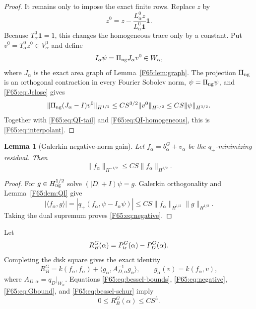 \documentclass[11pt]{amsart}
\numberwithin{equation}{section}
\newtheorem{lemma}[theorem]{Lemma}
\theoremstyle{definition}
\theoremstyle{remark}
\newcommand{\PiNG}{\Pi_{\rm ng}}
\newcommand{\qplus}{q_+}
\newcommand{\qdisk}{q_D}
\begin{document}
\begin{proof}
It remains only to impose the exact finite rows.  Replace \(z\) by
\begin{equation*}
 z^0=z-\frac{L_\alpha^0z}{L_\alpha^0\mathbf1}\mathbf1.
\end{equation*}
Because \(T_\alpha^0\mathbf1=1\), this changes the homogeneous trace only
by a constant.  Put \(v^0=T_\alpha^0z^0\in V_\alpha^0\) and define
\begin{equation}
 I_\alpha\psi=\PiNG J_\alpha v^0\in W_\alpha,
\end{equation}
where \(J_\alpha\) is the exact area graph of
Lemma~\ref{F65:lem:graph}.  The projection \(\PiNG\) is an orthogonal
contraction in every Fourier Sobolev norm, \(\psi=\PiNG\psi\), and
\eqref{F65:eq:Jclose} gives
\begin{equation*}
 \|\PiNG(J_\alpha-I)v^0\|_{H^{1/2}}
 \le CS^{3/2}\|v^0\|_{H^{1/2}}
 \le CS\|\psi\|_{H^{3/2}}.
\end{equation*}
Together with \eqref{F65:eq:QI-tail} and
\eqref{F65:eq:QI-homogeneous}, this is \eqref{F65:eq:interpolant}.
\end{proof}

\begin{lemma}[Galerkin negative-norm gain]\label{F65:lem:negative}
Let $f_\alpha=b_\alpha^G+v_\alpha$ be the $\qplus$-minimizing residual.
Then
\begin{equation}\label{F65:eq:negative}
 \|f_\alpha\|_{H^{-1/2}}
 \le CS\|f_\alpha\|_{H^{1/2}}.
\end{equation}
\end{lemma}

\begin{proof}
For $g\in H_{\rm ng}^{1/2}$ solve $(|D|+I)\psi=g$.  Galerkin
orthogonality and Lemma~\ref{F65:lem:QI} give
\begin{equation}
 |\langle f_\alpha,g\rangle|
 =|\qplus(f_\alpha,\psi-I_\alpha\psi)|
 \le CS\|f_\alpha\|_{H^{1/2}}\|g\|_{H^{1/2}}.
\end{equation}
Taking the dual supremum proves \eqref{F65:eq:negative}.
\end{proof}

Let
\begin{equation}
 R_B^G(\alpha)=P_{\rm tr}^G(\alpha)-P_D^G(\alpha).
\end{equation}
Completing the disk square gives the exact identity
\begin{equation}\label{F65:eq:bessel-schur}
 R_B^G
 =k(f_\alpha,f_\alpha)
 +\langle g_\alpha,A_{D,\alpha}^{-1}g_\alpha\rangle,
 \qquad g_\alpha(v)=k(f_\alpha,v),
\end{equation}
where $A_{D,\alpha}=\qdisk|_{W_\alpha}$.
Equations \eqref{F65:eq:bessel-bounds}, \eqref{F65:eq:negative},
\eqref{F65:eq:Gbound}, and \eqref{F65:eq:bessel-schur} imply
\begin{equation}\label{F65:eq:bessel-absolute}
 0\le R_B^G(\alpha)\le CS^5.
\end{equation}
\end{document}
